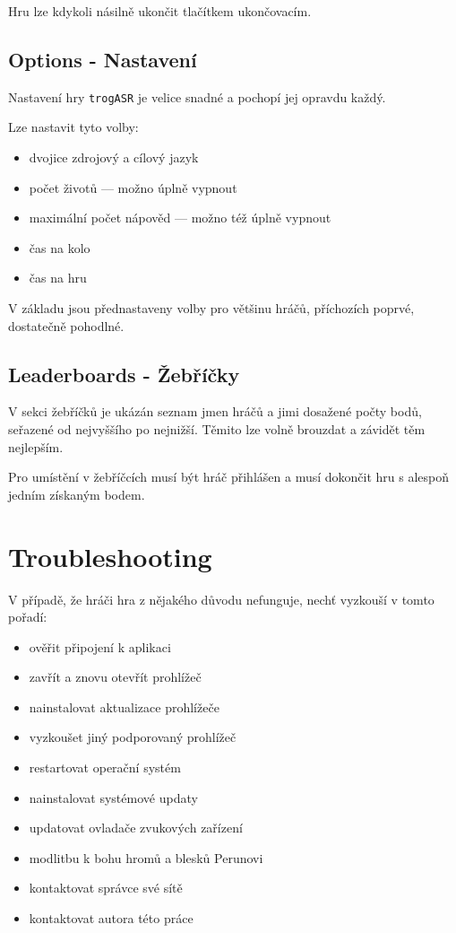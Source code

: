 Hru lze kdykoli násilně ukončit tlačítkem ukončovacím.

\subsection{Options - Nastavení}

Nastavení hry \verb|trogASR| je velice snadné a pochopí jej opravdu každý.

Lze nastavit tyto volby:

\begin{itemize}
\item dvojice zdrojový a cílový jazyk
\item počet životů --- možno úplně vypnout
\item maximální počet nápověd --- možno též úplně vypnout
\item čas na kolo
\item čas na hru
\end{itemize}

V základu jsou přednastaveny volby pro většinu hráčů, příchozích poprvé, dostatečně pohodlné.

\subsection{Leaderboards - Žebříčky}

V sekci žebříčků je ukázán seznam jmen hráčů a jimi dosažené počty bodů, seřazené od nejvyššího po nejnižší. Těmito lze volně brouzdat a závidět těm nejlepším.

Pro umístění v žebříčcích musí být hráč přihlášen a musí dokončit hru s alespoň jedním získaným bodem.

\section{Troubleshooting}

V případě, že hráči hra z nějakého důvodu nefunguje, nechť vyzkouší v tomto pořadí:

\begin{itemize}
\item ověřit připojení k aplikaci
\item zavřít a znovu otevřít prohlížeč
\item nainstalovat aktualizace prohlížeče
\item vyzkoušet jiný podporovaný prohlížeč
\item restartovat operační systém
\item nainstalovat systémové updaty
\item updatovat ovladače zvukových zařízení
\item modlitbu k bohu hromů a blesků Perunovi
\item kontaktovat správce své sítě
\item kontaktovat autora této práce
\end{itemize}
